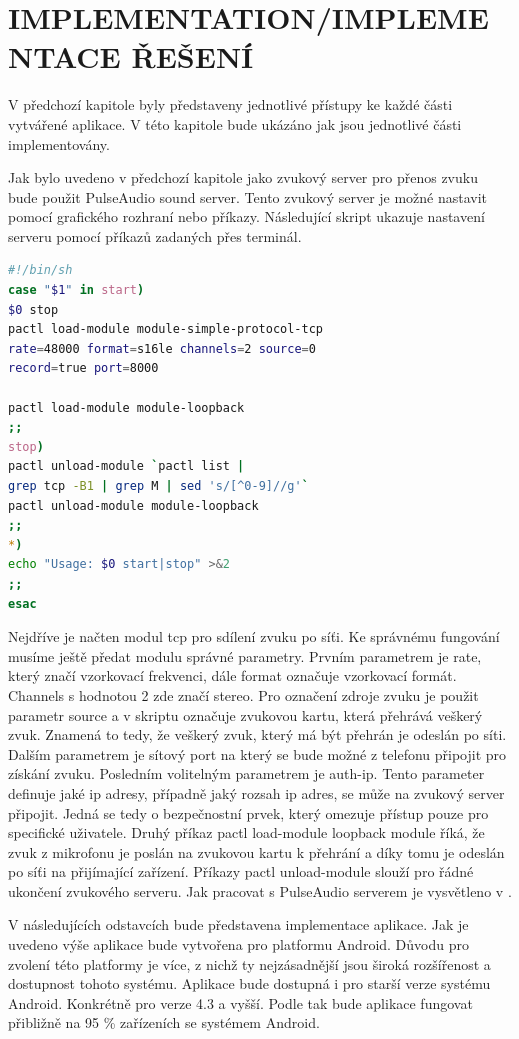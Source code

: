 \documentclass[journal, a4paper]{IEEEtran}
\begin{document}
\section{IMPLEMENTATION/IMPLEMENTACE ŘEŠENÍ}
V předchozí kapitole byly představeny jednotlivé přístupy ke každé části vytvářené aplikace. V této kapitole bude ukázáno jak jsou jednotlivé části implementovány. \par
Jak bylo uvedeno v předchozí kapitole jako zvukový server pro přenos zvuku bude použit PulseAudio sound server. Tento zvukový server je možné nastavit pomocí grafického rozhraní nebo příkazy. Následující skript ukazuje nastavení serveru pomocí příkazů zadaných přes terminál. 
{\small
\begin{lstlisting}[language=bash,caption={bash code}]
#!/bin/sh
case "$1" in start)
$0 stop 
pactl load-module module-simple-protocol-tcp 
rate=48000 format=s16le channels=2 source=0 
record=true port=8000

pactl load-module module-loopback
;;
stop)
pactl unload-module `pactl list | 
grep tcp -B1 | grep M | sed 's/[^0-9]//g'`
pactl unload-module module-loopback
;;
*)
echo "Usage: $0 start|stop" >&2
;;
esac
\end{lstlisting}
}
Nejdříve je načten modul tcp pro sdílení zvuku po síťi. Ke správnému fungování musíme ještě předat modulu správné parametry. Prvním parametrem je rate, který značí vzorkovací frekvenci, dále format označuje vzorkovací formát. Channels s hodnotou 2 zde značí stereo. Pro označení zdroje zvuku je použit parametr source a v skriptu označuje zvukovou kartu, která přehrává veškerý zvuk. Znamená to tedy, že veškerý zvuk, který má být přehrán je odeslán po síti. Dalším parametrem je sítový port na který se bude možné z telefonu připojit pro získání zvuku. Posledním volitelným parametrem je auth-ip. Tento parameter definuje jaké ip adresy, případně jaký rozsah ip adres, se může na zvukový server připojit. Jedná se tedy o bezpečnostní prvek, který omezuje přístup pouze pro specifické uživatele. Druhý příkaz pactl load-module loopback module říká, že zvuk z mikrofonu je poslán na zvukovou kartu k přehrání a díky tomu je odeslán po síťi na přijímající zařízení. Příkazy pactl unload-module slouží pro řádné ukončení zvukového serveru. Jak pracovat s PulseAudio serverem je vysvětleno v \cite{manpages}. \par
V následujících odstavcích bude představena implementace aplikace. Jak je uvedeno výše aplikace bude vytvořena pro platformu Android. Důvodu pro zvolení této platformy je více, z nichž ty nejzásadnější jsou široká rozšířenost a dostupnost tohoto systému. Aplikace bude dostupná i pro starší verze systému Android. Konkrétně pro verze 4.3 a vyšší. Podle \cite{androidstudio} tak bude aplikace fungovat přibližně na 95 \% zařízeních se systémem Android. \par
\end{document}
